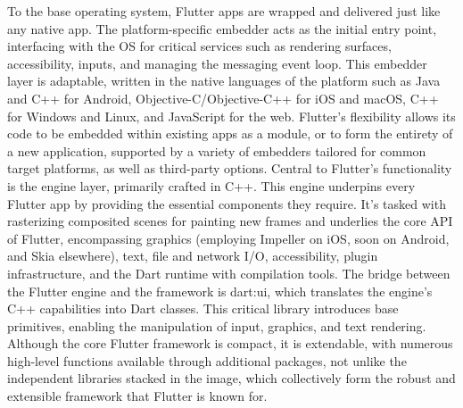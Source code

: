To the base operating system, Flutter apps are wrapped and delivered just like any native app. The
platform-specific embedder acts as the initial entry point, interfacing with the OS for critical
services such as rendering surfaces, accessibility, inputs, and managing the messaging event loop.
This embedder layer is adaptable, written in the native languages of the platform such as Java and
C++ for Android, Objective-C/Objective-C++ for iOS and macOS, C++ for Windows and Linux, and
JavaScript for the web. Flutter's flexibility allows its code to be embedded within existing apps as
a module, or to form the entirety of a new application, supported by a variety of embedders tailored
for common target platforms, as well as third-party options.
\newline\newline
Central to Flutter's functionality is the engine layer, primarily crafted in C++. This engine
underpins every Flutter app by providing the essential components they require. It's tasked with
rasterizing composited scenes for painting new frames and underlies the core API of Flutter,
encompassing graphics (employing Impeller on iOS, soon on Android, and Skia elsewhere), text, file
and network I/O, accessibility, plugin infrastructure, and the Dart runtime with compilation tools.
\newline\newline
The bridge between the Flutter engine and the framework is dart:ui, which translates the engine's
C++ capabilities into Dart classes. This critical library introduces base primitives, enabling the
manipulation of input, graphics, and text rendering. Although the core Flutter framework is compact,
it is extendable, with numerous high-level functions available through additional packages, not
unlike the independent libraries stacked in the image, which collectively form the robust and
extensible framework that Flutter is known for.

